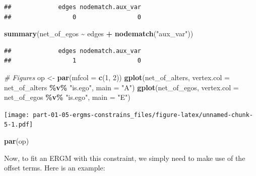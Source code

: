 \documentclass[
]{book}
\newenvironment{Shaded}{\begin{snugshade}}{\end{snugshade}}
\newcommand{\AttributeTok}[1]{\textcolor[rgb]{0.13,0.29,0.53}{#1}}
\newcommand{\CommentTok}[1]{\textcolor[rgb]{0.56,0.35,0.01}{\textit{#1}}}
\newcommand{\DecValTok}[1]{\textcolor[rgb]{0.00,0.00,0.81}{#1}}
\newcommand{\FunctionTok}[1]{\textcolor[rgb]{0.13,0.29,0.53}{\textbf{#1}}}
\newcommand{\NormalTok}[1]{#1}
\newcommand{\OtherTok}[1]{\textcolor[rgb]{0.56,0.35,0.01}{#1}}
\newcommand{\SpecialCharTok}[1]{\textcolor[rgb]{0.81,0.36,0.00}{\textbf{#1}}}
\newcommand{\StringTok}[1]{\textcolor[rgb]{0.31,0.60,0.02}{#1}}
\begin{document}
\begin{verbatim}
##             edges nodematch.aux_var 
##                 0                 0
\end{verbatim}

\begin{Shaded}
\begin{Highlighting}[]
\FunctionTok{summary}\NormalTok{(net\_of\_egos }\SpecialCharTok{\textasciitilde{}}\NormalTok{ edges }\SpecialCharTok{+} \FunctionTok{nodematch}\NormalTok{(}\StringTok{"aux\_var"}\NormalTok{))}
\end{Highlighting}
\end{Shaded}

\begin{verbatim}
##             edges nodematch.aux_var 
##                 1                 0
\end{verbatim}

\begin{Shaded}
\begin{Highlighting}[]
\CommentTok{\# Figures}
\NormalTok{op }\OtherTok{\textless{}{-}} \FunctionTok{par}\NormalTok{(}\AttributeTok{mfcol =} \FunctionTok{c}\NormalTok{(}\DecValTok{1}\NormalTok{, }\DecValTok{2}\NormalTok{))}
\FunctionTok{gplot}\NormalTok{(net\_of\_alters, }\AttributeTok{vertex.col =}\NormalTok{ net\_of\_alters }\SpecialCharTok{\%v\%} \StringTok{"is.ego"}\NormalTok{, }\AttributeTok{main =} \StringTok{"A"}\NormalTok{)}
\FunctionTok{gplot}\NormalTok{(net\_of\_egos, }\AttributeTok{vertex.col =}\NormalTok{ net\_of\_egos }\SpecialCharTok{\%v\%} \StringTok{"is.ego"}\NormalTok{, }\AttributeTok{main =} \StringTok{"E"}\NormalTok{)}
\end{Highlighting}
\end{Shaded}

\texttt{[image: part-01-05-ergms-constrains\_files/figure-latex/unnamed-chunk-5-1.pdf]}

\begin{Shaded}
\begin{Highlighting}[]
\FunctionTok{par}\NormalTok{(op)}
\end{Highlighting}
\end{Shaded}

Now, to fit an ERGM with this constraint, we simply need to make use of the offset terms. Here is an example:
\end{document}
